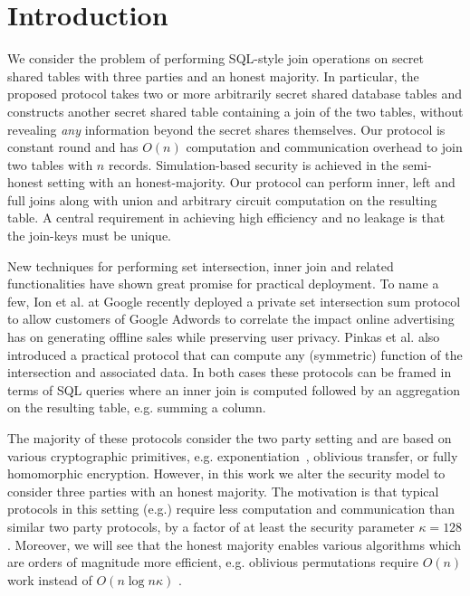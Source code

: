 \section{Introduction}

We consider the problem of performing SQL-style join operations on secret shared tables with three parties and an honest majority. In particular, the proposed protocol takes two or more arbitrarily secret shared database tables and constructs another secret shared table containing a join of the two tables, without revealing \emph{any} information beyond the secret shares themselves. Our protocol is constant round and  has $O(n)$ computation and communication  overhead to join two tables with $n$ records. Simulation-based security is achieved in the semi-honest setting with an honest-majority. Our protocol can perform inner, left and full joins along with union and arbitrary circuit computation on the resulting table. A central requirement in achieving high efficiency and no leakage is that the join-keys must be unique. 

New techniques \cite{usenix:PSZ14,USENIX:PSSZ15,PSZ16,CCS:KKRT16,PSWW18,CLR17,CHLR18,cryptoeprint:2017:738,RA17,KLSAP17,OOS17,KMPRT17} for performing set intersection, inner join and related functionalities have shown great promise for practical deployment. To name a few, Ion et al. at Google recently deployed a private set intersection sum protocol\cite{cryptoeprint:2017:738} to allow customers of Google Adwords to correlate the impact online advertising has on generating offline sales while preserving user privacy. Pinkas et al. \cite{PSWW18} also introduced a practical protocol that can compute any (symmetric) function of the intersection and associated data. In both cases these protocols can be framed in terms of SQL queries where an inner join is computed followed by an aggregation on the resulting table, e.g. summing a column.  

The majority of these protocols consider the two party setting and are based on various cryptographic primitives, e.g. exponentiation~\cite{cryptoeprint:2017:738}, oblivious transfer\cite{PSWW18}, or fully homomorphic encryption\cite{CLR17}. However, in this work we alter the security model to consider three parties with an honest majority. The motivation is that typical protocols in this setting (e.g.\cite{highthroughput}) require less computation and communication than similar two party protocols, by a factor of at least the security parameter $\kappa=128$. Moreover, we will see that the honest majority enables various algorithms which are orders of magnitude more efficient, e.g. oblivious permutations require $O(n)$ work instead of $O(n\log n \kappa)$ \cite{MS13}. 


